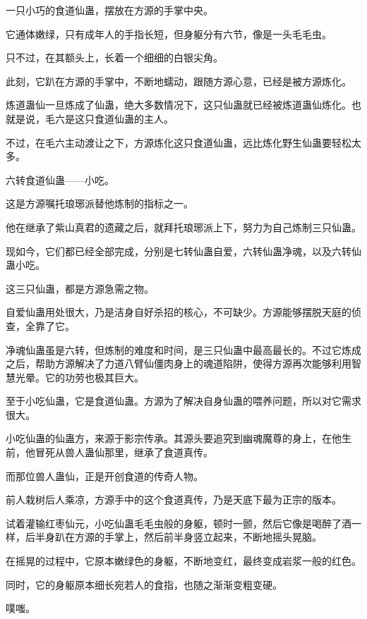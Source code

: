 
\begin{this_body}

一只小巧的食道仙蛊，摆放在方源的手掌中央。

它通体嫩绿，只有成年人的手指长短，但身躯分有六节，像是一头毛毛虫。

只不过，在其额头上，长着一个细细的白银尖角。

此刻，它趴在方源的手掌中，不断地蠕动，跟随方源心意，已经是被方源炼化。

炼道蛊仙一旦炼成了仙蛊，绝大多数情况下，这只仙蛊就已经被炼道蛊仙炼化。也就是说，毛六是这只食道仙蛊的主人。

不过，在毛六主动渡让之下，方源炼化这只食道仙蛊，远比炼化野生仙蛊要轻松太多。

六转食道仙蛊——小吃。

这是方源嘱托琅琊派替他炼制的指标之一。

他在继承了紫山真君的遗藏之后，就拜托琅琊派上下，努力为自己炼制三只仙蛊。

现如今，它们都已经全部完成，分别是七转仙蛊自爱，六转仙蛊净魂，以及六转仙蛊小吃。

这三只仙蛊，都是方源急需之物。

自爱仙蛊用处很大，乃是洁身自好杀招的核心，不可缺少。方源能够摆脱天庭的侦查，全靠了它。

净魂仙蛊虽是六转，但炼制的难度和时间，是三只仙蛊中最高最长的。不过它炼成之后，帮助方源解决了力道八臂仙僵肉身上的魂道陷阱，使得方源再次能够利用智慧光晕。它的功劳也极其巨大。

至于小吃仙蛊，它是食道仙蛊。方源为了解决自身仙蛊的喂养问题，所以对它需求很大。

小吃仙蛊的仙蛊方，来源于影宗传承。其源头要追究到幽魂魔尊的身上，在他生前，他冒死从兽人蛊仙那里，继承了食道真传。

而那位兽人蛊仙，正是开创食道的传奇人物。

前人栽树后人乘凉，方源手中的这个食道真传，乃是天底下最为正宗的版本。

试着灌输红枣仙元，小吃仙蛊毛毛虫般的身躯，顿时一颤，然后它像是喝醉了酒一样，后半身趴在方源的手掌上，然后前半身竖立起来，不断地摇头晃脑。

在摇晃的过程中，它原本嫩绿色的身躯，不断地变红，最终变成岩浆一般的红色。

同时，它的身躯原本细长宛若人的食指，也随之渐渐变粗变硬。

噗嗤。


\end{this_body}

